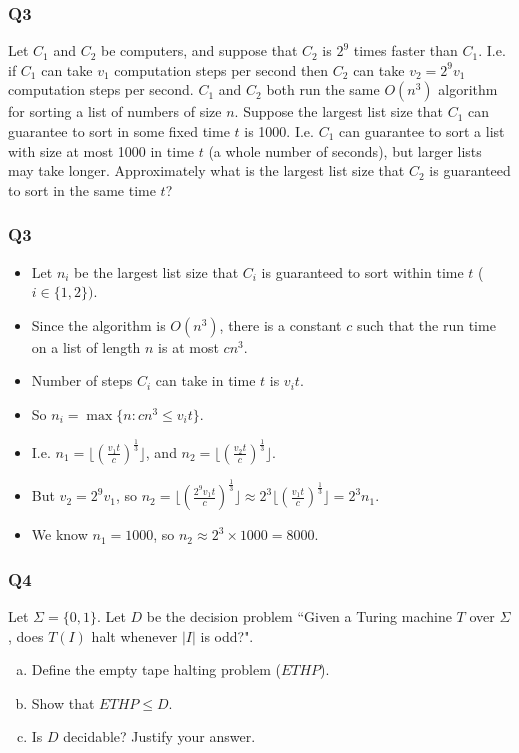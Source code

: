 \documentclass[handout]{beamer}
\begin{document}
\begin{frame}
\frametitle{Q3}
Let $C_1$ and $C_2$ be computers, and suppose that $C_2$ is $2^9$ times faster than $C_1$. I.e. if $C_1$ can take $v_1$ computation steps per second then $C_2$ can take $v_2=2^9v_1$ computation steps per second. $C_1$ and $C_2$ both run the same $O(n^3)$ algorithm for sorting a list of numbers of size $n$. Suppose the largest list size that $C_1$ can guarantee to sort in some fixed time $t$ is 1000. I.e. $C_1$ can guarantee to sort a list with size at most 1000 in time $t$ (a whole number of seconds), but larger lists may take longer. Approximately what is the largest list size that $C_2$ is guaranteed to sort in the same time $t$? 
\end{frame}

\begin{frame}
\frametitle{Q3}
\begin{itemize}
\item Let $n_i$ be the largest list size that $C_i$ is guaranteed to sort within time $t$ ($i\in\{1,2\})$. 
\vspace{0.3cm}
\item Since the algorithm is $O(n^3)$, there is a constant $c$ such that the run time on a list of length $n$ is at most $cn^3$. 
\vspace{0.3cm}
\item Number of steps $C_i$ can take in time $t$ is $v_it$.
\vspace{0.3cm}
\item So $n_i = \max \{n : cn^3\leq v_it\}$.
\vspace{0.3cm}
\item I.e. $n_1 = \lfloor (\frac{v_1t}{c})^{\frac{1}{3}} \rfloor$, and $n_2 = \lfloor (\frac{v_2t}{c})^{\frac{1}{3}} \rfloor$.
\vspace{0.3cm}
\item But $v_2 = 2^9v_1$, so $n_2 = \lfloor (\frac{2^9v_1t}{c})^{\frac{1}{3}} \rfloor \approx 2^3\lfloor (\frac{v_1t}{c})^{\frac{1}{3}} \rfloor = 2^3n_1$.
\vspace{0.3cm}
\item We know $n_1 = 1000$, so $n_2\approx 2^3\times 1000 = 8000$. 
\end{itemize}
\end{frame}


\begin{frame}
\frametitle{Q4}
Let $\Sigma = \{0,1\}$. Let $D$ be the decision problem ``Given a Turing machine $T$ over $\Sigma$, does $T(I)$ halt whenever $|I|$ is odd?". 
\begin{enumerate}[a)]
\item Define the empty tape halting problem ($ETHP$).
\item Show that $ETHP \leq D$.
\item Is $D$ decidable? Justify your answer.
\end{enumerate}
\end{frame}
\end{document}
